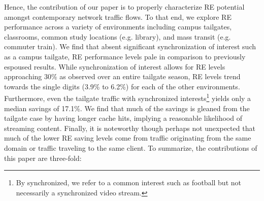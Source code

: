 \documentclass{sig-alternate}
\begin{document}
Hence, the contribution of our paper is to properly characterize RE potential amongst contemporary network traffic flows. To that end, we explore RE performance across a variety of environments including campus tailgates, classrooms, common study locations (e.g. library), and mass transit (e.g. commuter train). We find that absent significant synchronization of interest such as a campus tailgate, RE performance levels pale in comparison to previously espoused results. While synchronization of interest allows for RE levels approaching 30\% as observed over an entire tailgate season, RE levels trend towards the single digits (3.9\% to 6.2\%) for each of the other environments. Furthermore, even the tailgate traffic with synchronized interests\footnote{By synchronized, we refer to a common interest such as football but not necessarily a synchronized video stream.} yields only a median savings of 17.1\%. We find that much of the savings is gleaned from the tailgate case by having longer cache hits, implying a reasonable likelihood of streaming content. Finally, it is noteworthy though perhaps not unexpected that much of the lower RE saving levels come from traffic originating from the same domain or traffic traveling to the same client. To summarize, the contributions of this paper are three-fold:        
\end{document}
